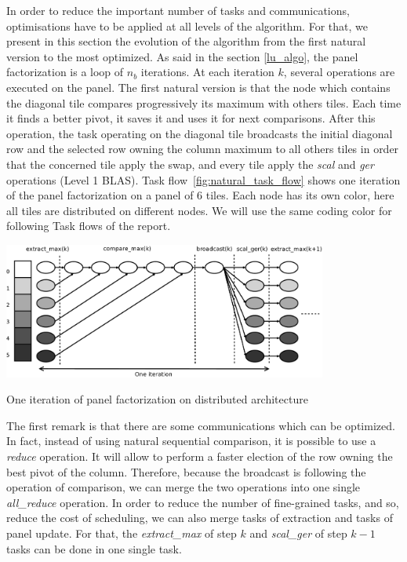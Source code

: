 In order to reduce the important number of tasks and communications, optimisations have to be applied at all levels of the algorithm. For that, we present in this section the evolution of the algorithm from the first natural version to the most optimized. As said in the section \ref{lu_algo}, the panel factorization is a loop of $n_b$ iterations. At each iteration $k$, several operations are executed on the panel.
The first natural version is that the node which contains the diagonal tile compares progressively its maximum with others tiles. Each time it finds a better pivot, it saves it and uses it for next comparisons. After this operation, the task operating on the diagonal tile broadcasts the initial diagonal row and the selected row owning the column maximum to all others tiles in order that the concerned tile apply the swap, and every tile apply the \emph{scal} and \emph{ger} operations (Level 1 BLAS). Task flow~\ref{fig:natural_task_flow} shows one iteration of the panel factorization on a panel of 6 tiles. Each node has its own color, here all tiles are distributed on different nodes. We will use the same coding color for following Task flows of the report.

\begin{taskflow}[!ht]
\centering
\includegraphics[width=0.8\textwidth]{figures/natural_tf_bw.pdf}
\caption{One iteration of panel factorization on distributed architecture \label{fig:natural_task_flow}}
\end{taskflow}

The first remark is that there are some communications which can be optimized. In fact, instead of using natural sequential comparison, it is possible to use a \emph{reduce} operation. It will allow to perform a faster election of the row owning the best pivot of the column. Therefore, because the broadcast is following the operation of comparison, we can merge the two operations into one single \emph{all\_reduce} operation.
In order to reduce the number of fine-grained tasks, and so, reduce the cost of scheduling, we can also merge tasks of extraction and tasks of panel update. For that, the \emph{extract\_max} of step $k$ and \emph{scal\_ger} of step $k-1$ tasks can be done in one single task.

